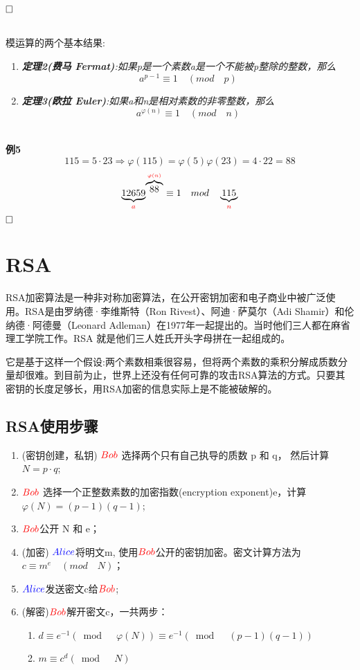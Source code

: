 \documentclass{article}
\begin{document}
$\hfill\square$ 

~\\
模运算的两个基本结果:

\begin{enumerate}
\item \textit{\textbf{定理2(费马 Fermat)}:如果p是一个素数a是一个不能被p整除的整数，那么}
$$a^{p-1} \equiv 1 \quad (mod \quad p)$$
\item \textit{\textbf{定理3(欧拉 Euler)}:如果a和n是相对素数的非零整数，那么}
$$a^{\varphi(n)} \equiv 1 \quad (mod \quad n)$$
\end{enumerate} 

~\\

\textbf{例5}
$$
115 = 5 \cdot 23  \Rightarrow \varphi(115) = \varphi(5)\varphi(23) = 4 \cdot 22 = 88
$$
$$
 {\underbrace{12659}_{{\color{red}a}}}^{ \overbrace{88}^{{\color{red}\varphi(n)}}} \equiv 1 \quad mod  \quad \underbrace{115}_{{\color{red}n}}
$$
$\hfill\square$ 

\section{RSA}

RSA加密算法是一种非对称加密算法，在公开密钥加密和电子商业中被广泛使用。RSA是由罗纳德·李维斯特（Ron Rivest）、阿迪·萨莫尔（Adi Shamir）和伦纳德·阿德曼（Leonard Adleman）在1977年一起提出的。当时他们三人都在麻省理工学院工作。RSA 就是他们三人姓氏开头字母拼在一起组成的。

它是基于这样一个假设:两个素数相乘很容易，但将两个素数的乘积分解成质数分量却很难。到目前为止，世界上还没有任何可靠的攻击RSA算法的方式。只要其密钥的长度足够长，用RSA加密的信息实际上是不能被破解的。

\subsection{RSA使用步骤}

\begin{enumerate}
\item (密钥创建，私钥) ${\color{red}Bob}$ 选择两个只有自己执导的质数 p 和 q， 然后计算$N = p \cdot q$; 
\item ${\color{red}Bob}$ 选择一个正整数素数的加密指数(encryption exponent)e，计算$\varphi(N) = (p-1)(q-1)$;
\item ${\color{red}Bob}$公开 N 和 e；
\item (加密) ${\color{blue}Alice}$将明文m, 使用${\color{red}Bob}$公开的密钥加密。密文计算方法为$c \equiv m^e \quad (mod \quad N)$；
\item ${\color{blue}Alice}$发送密文c给${\color{red}Bob}$;
\item (解密)${\color{red}Bob}$解开密文c，一共两步：
\begin{enumerate}
\item $d \equiv e^{-1}(\bmod \quad \varphi(N)) \equiv e^{-1}(\bmod \quad  (p-1)(q-1))$
\item $m \equiv c^d (\bmod \quad  N)$
\end{enumerate}
\end{enumerate}
\end{document}
